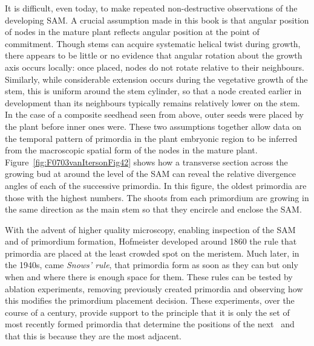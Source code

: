 It is difficult, even today, to make repeated non-destructive observations of the developing SAM. A crucial assumption made in this book is that angular position of nodes in the mature plant reflects angular position at the point of commitment. Though stems can acquire systematic helical twist during growth, there appears to be little or no evidence that angular rotation about the growth axis occurs locally: once placed,  nodes do not rotate relative to their neighbours. Similarly, while considerable  extension occurs during the vegetative growth of the stem, this is uniform around the stem cylinder, so that a node created earlier in development than its neighbours typically remains relatively lower on the stem.  In the case of a composite seedhead seen from above, outer seeds were placed by the plant before inner ones were. 
These two assumptions together allow data on the temporal pattern of primordia in the plant embryonic region to be inferred from the macroscopic spatial form of the nodes in the mature plant.
Figure~\ref{fig:F0703vanItersonFig42} shows how a transverse section across the growing bud at around the level of the SAM can reveal the relative divergence angles of each of the successive primordia. In this figure, the oldest primordia are those with the highest numbers. The shoots from each primordium are growing in the same direction as the main stem so that they encircle and enclose the SAM. 
 
With the advent of higher quality microscopy, enabling inspection of the SAM and of primordium formation,  Hofmeister developed around 1860 the rule  that primordia are placed at the least crowded spot on the meristem. Much later, in the 1940s, came \emph{Snows' rule}, that primordia form as soon as they can but only when and where there is enough space for them.%
 These rules can be tested by ablation experiments, removing previously created primordia and observing how this modifies the primordium placement decision. These experiments, over the course of a century, provide support to the principle that it is only the set of most recently formed primordia that determine the positions of the next~\autocite{snowExperimentsPhyllotaxisII1933,reinhardtRegulationPhyllotaxisPolar2003} and that this is because they are the most adjacent. 
 
